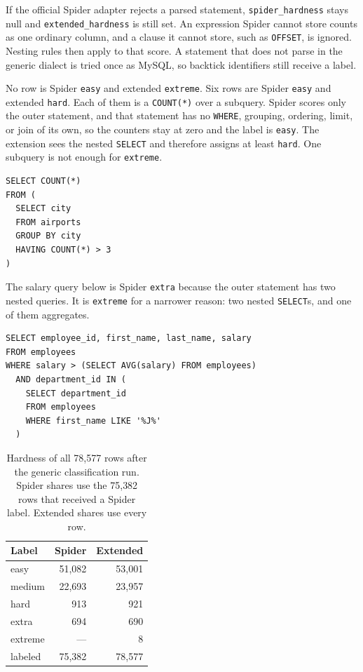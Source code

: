 \documentclass[11pt,a4paper]{article}
\begin{document}
If the official Spider adapter rejects a parsed statement,
\texttt{spider\_hardness} stays null and \texttt{extended\_hardness} is still
set. An expression Spider cannot store counts as one ordinary column, and a
clause it cannot store, such as \texttt{OFFSET}, is ignored. Nesting rules
then apply to that score. A statement that does not parse in the generic
dialect is tried once as MySQL, so backtick identifiers still receive a label.

No row is Spider \texttt{easy} and extended \texttt{extreme}. Six rows are
Spider \texttt{easy} and extended \texttt{hard}. Each of them is a
\texttt{COUNT(*)} over a subquery. Spider scores only the outer statement, and
that statement has no \texttt{WHERE}, grouping, ordering, limit, or join of
its own, so the counters stay at zero and the label is \texttt{easy}. The
extension sees the nested \texttt{SELECT} and therefore assigns at least
\texttt{hard}. One subquery is not enough for \texttt{extreme}.

\begin{lstlisting}[caption={Spider easy, extended hard. The outer count hides a grouped subquery.}]
SELECT COUNT(*)
FROM (
  SELECT city
  FROM airports
  GROUP BY city
  HAVING COUNT(*) > 3
)
\end{lstlisting}

The salary query below is Spider \texttt{extra} because the outer statement
has two nested queries. It is \texttt{extreme} for a narrower reason: two
nested \texttt{SELECT}s, and one of them aggregates.

\begin{lstlisting}[caption={Spider extra, extended extreme. The inner average is one of two nested queries.}]
SELECT employee_id, first_name, last_name, salary
FROM employees
WHERE salary > (SELECT AVG(salary) FROM employees)
  AND department_id IN (
    SELECT department_id
    FROM employees
    WHERE first_name LIKE '%J%'
  )
\end{lstlisting}

\begin{table}[ht]
  \centering
  \caption{Hardness of all 78{,}577 rows after the generic classification run.
  Spider shares use the 75{,}382 rows that received a Spider label. Extended
  shares use every row.}
  \label{tab:hardness}
  \begin{tabular}{lrr}
    \toprule
    Label & Spider & Extended \\
    \midrule
    easy    & 51{,}082 & 53{,}001 \\
    medium  & 22{,}693 & 23{,}957 \\
    hard    &    913   &    921 \\
    extra   &    694   &    690 \\
    extreme &      --- &      8 \\
    \midrule
    labeled & 75{,}382 & 78{,}577 \\
    \bottomrule
  \end{tabular}
\end{table}
\end{document}
